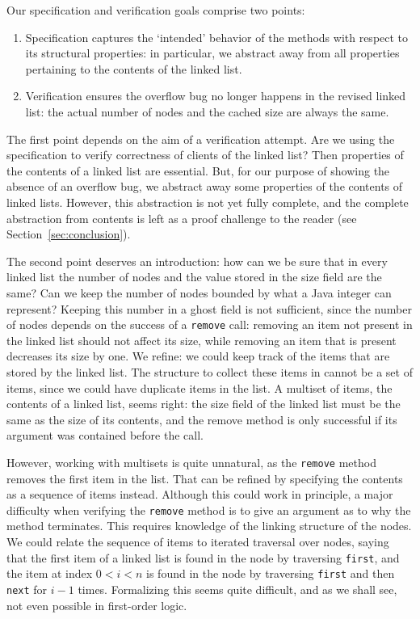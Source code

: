\documentclass[runningheads]{llncs}
\theoremstyle{remark}
\begin{document}
Our specification and verification goals comprise two points:

\begin{enumerate}
    \item Specification captures the `intended' behavior of the methods with respect to its structural properties: in particular, we abstract away from all properties pertaining to the contents of the linked list.
    \item Verification ensures the overflow bug no longer happens in the revised linked list: the actual number of nodes and the cached size are always the same.
\end{enumerate}

The first point depends on the aim of a verification attempt. Are we using the specification to verify correctness of clients of the linked list? Then properties of the contents of a linked list are essential. But, for our purpose of showing the absence of an overflow bug, we abstract away some properties of the contents of linked lists. However, this abstraction is not yet fully complete, and the complete abstraction from contents is left as a proof challenge to the reader (see Section~\ref{sec:conclusion}).

The second point deserves an introduction: how can we be sure that in every linked list the number of nodes and the value stored in the size field are the same? Can we keep the number of nodes bounded by what a Java integer can represent? Keeping this number in a ghost field is not sufficient, since the number of nodes depends on the success of a \texttt{remove} call: removing an item not present in the linked list should not affect its size, while removing an item that is present decreases its size by one. We refine: we could keep track of the items that are stored by the linked list. The structure to collect these items in cannot be a set of items, since we could have duplicate items in the list. A multiset of items, the contents of a linked list, seems right: the size field of the linked list must be the same as the size of its contents, and the remove method is only successful if its argument was contained before the call.

However, working with multisets is quite unnatural, as the \texttt{remove} method removes the first item in the list. That can be refined by specifying the contents as a sequence of items instead. Although this could work in principle, a major difficulty when verifying the \texttt{remove} method is to give an argument as to why the method terminates. This requires knowledge of the linking structure of the nodes. We could relate the sequence of items to iterated traversal over nodes, saying that the first item of a linked list is found in the node by traversing \texttt{first}, and the item at index $0<i<n$ is found in the node by traversing \texttt{first} and then \texttt{next} for $i-1$ times. Formalizing this seems quite difficult, and as we shall see, not even possible in first-order logic.
\end{document}
